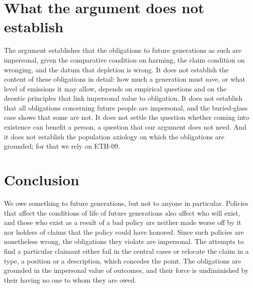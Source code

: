 \documentclass{situationist-preprint}
\begin{document}
\section{What the argument does not establish}\label{s:limits}

The argument establishes that the obligations to future generations as such are impersonal, given the comparative condition on harming, the claim condition on wronging, and the datum that depletion is wrong. It does not establish the content of these obligations in detail: how much a generation must save, or what level of emissions it may allow, depends on empirical questions and on the deontic principles that link impersonal value to obligation. It does not establish that all obligations concerning future people are impersonal, and the buried-glass case shows that some are not. It does not settle the question whether coming into existence can benefit a person, a question that our argument does not need. And it does not establish the population axiology on which the obligations are grounded; for that we rely on ETH-09.

\section{Conclusion}

We owe something to future generations, but not to anyone in particular. Policies that affect the conditions of life of future generations also affect who will exist, and those who exist as a result of a bad policy are neither made worse off by it nor holders of claims that the policy could have honored. Since such policies are nonetheless wrong, the obligations they violate are impersonal. The attempts to find a particular claimant either fail in the central cases or relocate the claim in a type, a position or a description, which concedes the point. The obligations are grounded in the impersonal value of outcomes, and their force is undiminished by their having no one to whom they are owed.
\end{document}
